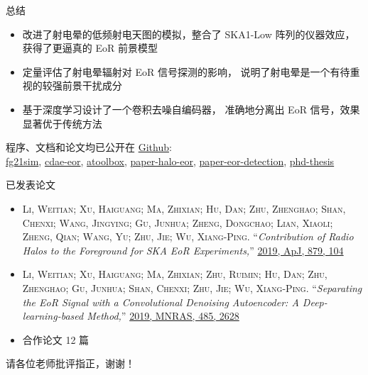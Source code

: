 \documentclass{beamer}
\begin{document}
\begin{frame}{总\cspace{}结}
  \begin{itemize}
    \item 改进了射电晕的低频射电天图的模拟，整合了 SKA1-Low 阵列的仪器效应，
      获得了更逼真的 EoR 前景模型
    \item 定量评估了射电晕辐射对 EoR 信号探测的影响，
      说明了射电晕是一个有待重视的较强前景干扰成分
    \item 基于深度学习设计了一个卷积去噪自编码器，
      准确地分离出 EoR 信号，效果显著优于传统方法
  \end{itemize}

  程序、文档和论文均已公开在
  \href{https://github.com/liweitianux/}{Github}:\\
  \href{https://github.com/liweitianux/fg21sim}{fg21sim},
  \href{https://github.com/liweitianux/cdae-eor}{cdae-eor},
  \href{https://github.com/liweitianux/atoolbox}{atoolbox},
  \href{https://github.com/liweitianux/paper-halo-eor}{paper-halo-eor},
  \href{https://github.com/liweitianux/paper-eor-detection}{paper-eor-detection},
  \href{https://github.com/liweitianux/phd-thesis}{phd-thesis}
\end{frame}

\begin{frame}{已发表论文}
  \small
  \begin{itemize}
    \item
      \textsc{\alert{Li, Weitian}; Xu, Haiguang; Ma, Zhixian; Hu, Dan;
      Zhu, Zhenghao; Shan, Chenxi; Wang, Jingying; Gu, Junhua;
      Zheng, Dongchao; Lian, Xiaoli; Zheng, Qian; Wang, Yu;
      Zhu, Jie; Wu, Xiang-Ping}.
      \enquote{\it Contribution of Radio Halos to the Foreground for
        SKA EoR Experiments,}
      \href{http://adsabs.harvard.edu/abs/2019ApJ...879..104L}{%
        2019, ApJ, 879, 104}
    \item
      \textsc{\alert{Li, Weitian}; Xu, Haiguang; Ma, Zhixian; Zhu, Ruimin;
      Hu, Dan; Zhu, Zhenghao; Gu, Junhua; Shan, Chenxi; Zhu, Jie;
      Wu, Xiang-Ping}.
      \enquote{\it Separating the EoR Signal with a Convolutional Denoising
        Autoencoder: A Deep-learning-based Method,}
      \href{http://adsabs.harvard.edu/abs/2019MNRAS.485.2628L}{%
        2019, MNRAS, 485, 2628}
    \item
      合作论文 12 篇
  \end{itemize}
\end{frame}

\begin{frame}[standout]
  \huge 请各位老师批评指正，谢谢！
\end{frame}
\end{document}
